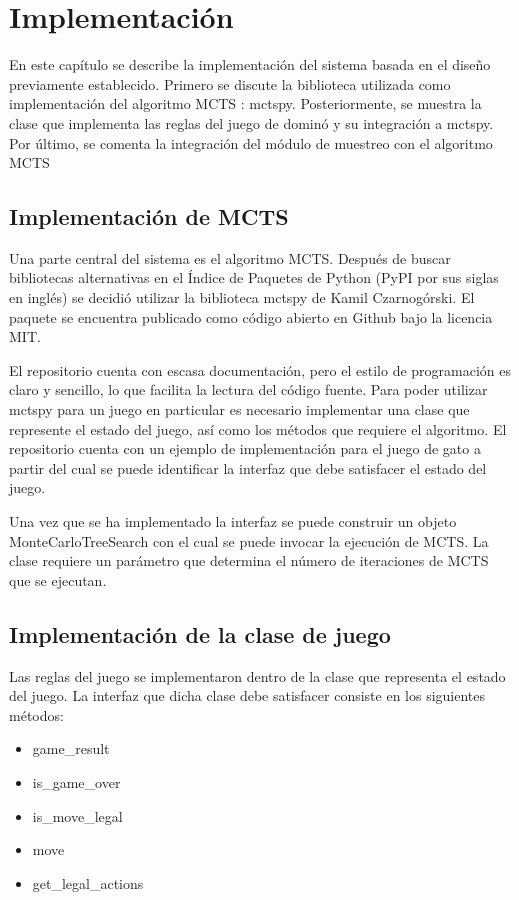 \chapter{Implementación}

\noindent

En este capítulo se describe la implementación del sistema basada en el diseño
previamente establecido. Primero se discute la biblioteca utilizada como
implementación del algoritmo MCTS : mctspy. Posteriormente, se muestra la clase
que implementa las reglas del juego de dominó y su integración a mctspy. Por
último, se comenta la integración del módulo de muestreo con el algoritmo MCTS

\section{Implementación de MCTS}

Una parte central del sistema es el algoritmo MCTS. Después de buscar bibliotecas
alternativas en el Índice de Paquetes de Python (PyPI por sus siglas en inglés)
se decidió utilizar la biblioteca mctspy de Kamil Czarnogórski. El paquete se
encuentra publicado como código abierto en Github bajo la licencia MIT.

El repositorio cuenta con escasa documentación, pero el estilo de programación
es claro y sencillo, lo que facilita la lectura del código fuente. Para poder
utilizar mctspy para un juego en particular es necesario implementar una clase
que represente el estado del juego, así como los métodos que requiere el
algoritmo. El repositorio cuenta con un ejemplo de implementación para el juego
de gato a partir del cual se puede identificar la interfaz que debe satisfacer
el estado del juego.

Una vez que se ha implementado la interfaz se puede construir un objeto
MonteCarloTreeSearch con el cual se puede invocar la ejecución de MCTS. La clase
requiere un parámetro que determina el número de iteraciones de MCTS que se
ejecutan.

\section{Implementación de la clase de juego}

Las reglas del juego se implementaron dentro de la clase que representa el
estado del juego. La interfaz que dicha clase debe satisfacer consiste en los
siguientes métodos:

\begin{itemize}
   \item game\_result
   \item is\_game\_over
   \item is\_move\_legal
   \item move
   \item get\_legal\_actions
\end{itemize}


